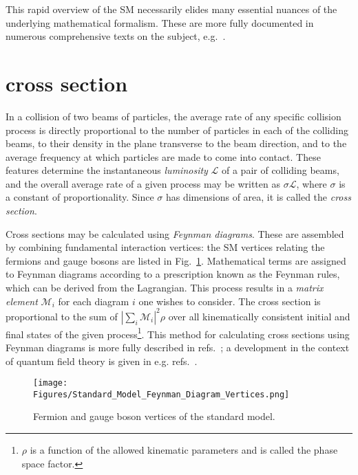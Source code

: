 This rapid overview of the SM necessarily elides many essential nuances of the underlying mathematical formalism. These are more fully
documented in numerous comprehensive texts on the subject, e.g.~\cite{ref:HalzenMartin, ref:BargerPhillips, ref:PeskinSchroeder, ref:Srednicki, ref:Schwartz}.

\section{\texorpdfstring{\zinvg}{Z(νν)γ} cross section} \label{sec:introduction_znng}
In a collision of two beams of particles, the average rate of any specific collision process is directly proportional to the
number of particles in each of the colliding beams, to their density in the plane transverse to the beam direction, and to the average
frequency at which particles are made to come into contact. These features determine the instantaneous \textit{luminosity} $\mathcal{L}$ of a pair
of colliding beams, and the overall average rate of a given process may be written as $\sigma \mathcal{L}$, where $\sigma$
is a constant of proportionality. Since $\sigma$ has dimensions of area, it is called the \textit{cross section}.

Cross sections may be calculated using \textit{Feynman diagrams}. These are
assembled by combining fundamental interaction vertices: the SM vertices relating the fermions and gauge bosons are listed in Fig.~\ref{fig:sm_vertices}.
Mathematical terms are assigned to Feynman diagrams according to a prescription known as the Feynman rules, which can be derived from the Lagrangian.
This process results in a \textit{matrix element} $\mathcal{M}_{i}$ for each diagram $i$ one wishes to consider. The cross section is proportional to the sum of $|\sum_{i}{\mathcal{M}_{i}}|^{2}\rho$
over all kinematically consistent initial and final states of the given process\footnote{$\rho$ is a function of the allowed kinematic parameters and is called the phase space
factor.}. This method for calculating cross sections using Feynman diagrams is more fully described in refs.~\cite{ref:HalzenMartin, ref:BargerPhillips};
a development in the context of quantum field theory is given in e.g. refs.~\cite{ref:PeskinSchroeder, ref:Srednicki, ref:Schwartz}.

\begin{figure}[hbtp]
  \begin{center}
    \texttt{[image: Figures/Standard\_Model\_Feynman\_Diagram\_Vertices.png]}
    \caption{
      Fermion and gauge boson vertices of the standard model.
    }
    \label{fig:sm_vertices}
  \end{center}
\end{figure}

